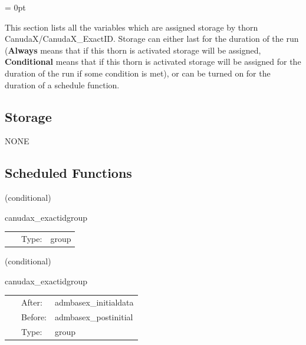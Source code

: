 \parskip = 0pt


\noindent This section lists all the variables which are assigned storage by thorn CanudaX/CanudaX\_ExactID.  Storage can either last for the duration of the run ({\bf Always} means that if this thorn is activated storage will be assigned, {\bf Conditional} means that if this thorn is activated storage will be assigned for the duration of the run if some condition is met), or can be turned on for the duration of a schedule function.


\subsection*{Storage}NONE
\subsection*{Scheduled Functions}
\vspace{5mm}

   (conditional) 

\hspace{5mm} canudax\_exactidgroup 

\hspace{5mm}{\it canudax\_exactid group for setting up initial data } 


\hspace{5mm}

 \begin{tabular*}{160mm}{cll} 
~ & Type:  & group \\ 
\end{tabular*} 


\vspace{5mm}

   (conditional) 

\hspace{5mm} canudax\_exactidgroup 

\hspace{5mm}{\it canudax\_exactid group for setting up initial data } 


\hspace{5mm}

 \begin{tabular*}{160mm}{cll} 
~ & After:  & admbasex\_initialdata \\ 
~ & Before:  & admbasex\_postinitial \\ 
~ & Type:  & group \\ 
\end{tabular*} 


